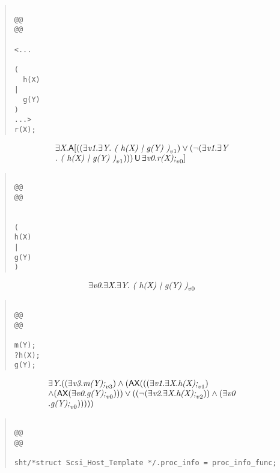 \documentclass{article}
\newcommand{\U}{\,\mbox{\sf{U}}\,}
\newcommand{\A}{\mbox{\sf{A}}}
\newcommand{\AX}{\mbox{\sf{AX}}}
\newcommand{\mita}[1]{\mbox{\it{{#1}}}}
\begin{document}
\begin{quote}\begin{verbatim}

@@
@@

<...
  
(
  h(X)
|
  g(Y)
)
...>
r(X);
\end{verbatim}\end{quote}

\[\begin{array}{l}
\exists \mita{X} . \A[((\exists \mita{v1} . \exists \mita{Y} . \mita{
(
h(X)
|
g(Y)
)}_{v1}) \vee (\neg (\exists \mita{v1} . \exists \mita{Y}\\ . \mita{
(
h(X)
|
g(Y)
)}_{v1}))) \U \exists \mita{v0} . \mita{r(X);}_{v0}]

\end{array}\]

\begin{quote}\begin{verbatim}

@@
@@


(
h(X)
|
g(Y)
)
\end{verbatim}\end{quote}

\[\begin{array}{l}
\exists \mita{v0} . \exists \mita{X} . \exists \mita{Y} . \mita{
(
h(X)
|
g(Y)
)}_{v0}
\end{array}\]

\begin{quote}\begin{verbatim}

@@
@@

m(Y);
?h(X);
g(Y);
\end{verbatim}\end{quote}

\[\begin{array}{l}
\exists \mita{Y} . ((\exists \mita{v3} . \mita{m(Y);}_{v3}) \wedge (\AX(((\exists \mita{v1} . \exists \mita{X} . \mita{h(X);}_{v1})\\ \wedge (\AX(\exists \mita{v0} . \mita{g(Y);}_{v0}))) \vee ((\neg (\exists \mita{v2} . \exists \mita{X} . \mita{h(X);}_{v2})) \wedge (\exists \mita{v0}\\ . \mita{g(Y);}_{v0})))))
\end{array}\]

\begin{quote}\begin{verbatim}

@@
@@

sht/*struct Scsi_Host_Template */.proc_info = proc_info_func;
\end{verbatim}\end{quote}
\end{document}
